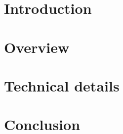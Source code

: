 \documentclass[12pt,twoside]{report}
\begin{document}





\tableofcontents
\listoffigures
\listoftables

\chapter{Introduction}


\chapter{Overview}


\chapter{Technical details}


\chapter{Conclusion}


\printbibliography\
\end{document}
